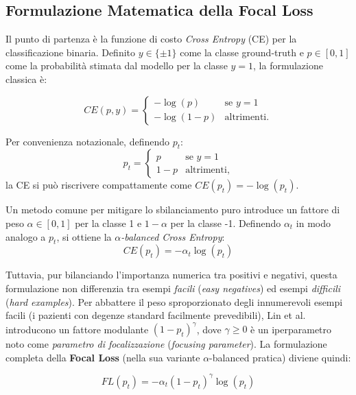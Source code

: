 \subsection{Formulazione Matematica della Focal Loss}
Il punto di partenza è la funzione di costo \textit{Cross Entropy} (CE) per la classificazione binaria. Definito $y \in \{\pm 1\}$ come la classe ground-truth e $p \in [0, 1]$ come la probabilità stimata dal modello per la classe $y=1$, la formulazione classica è:

\begin{equation}
CE(p, y) = \begin{cases} -\log(p) & \text{se } y=1 \\ -\log(1-p) & \text{altrimenti.} \end{cases}
\end{equation}

Per convenienza notazionale, definendo $p_t$:
\begin{equation}
p_t = \begin{cases} p & \text{se } y=1 \\ 1-p & \text{altrimenti,} \end{cases}
\end{equation}
la CE si può riscrivere compattamente come $CE(p_t) = -\log(p_t)$.

Un metodo comune per mitigare lo sbilanciamento puro introduce un fattore di peso $\alpha \in [0, 1]$ per la classe 1 e $1-\alpha$ per la classe -1. Definendo $\alpha_t$ in modo analogo a $p_t$, si ottiene la \textit{$\alpha$-balanced Cross Entropy}:
\begin{equation}
CE(p_t) = -\alpha_t \log(p_t)
\end{equation}

Tuttavia, pur bilanciando l'importanza numerica tra positivi e negativi, questa formulazione non differenzia tra esempi \textit{facili} (\textit{easy negatives}) ed esempi \textit{difficili} (\textit{hard examples}). Per abbattere il peso sproporzionato degli innumerevoli esempi facili (i pazienti con degenze standard facilmente prevedibili), Lin et al. introducono un fattore modulante $(1-p_t)^\gamma$, dove $\gamma \ge 0$ è un iperparametro noto come \textit{parametro di focalizzazione} (\textit{focusing parameter}). La formulazione completa della \textbf{Focal Loss} (nella sua variante $\alpha$-balanced pratica) diviene quindi:

\begin{equation}
FL(p_t) = -\alpha_t (1-p_t)^\gamma \log(p_t)
\end{equation}

